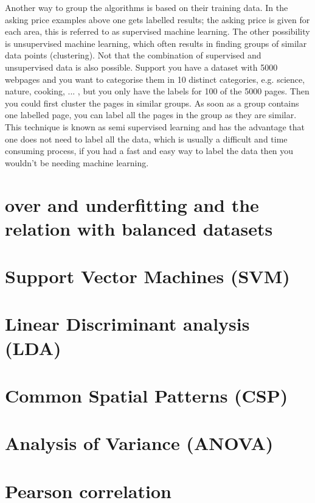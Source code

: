 \npar

Another way to group the algorithms is based on their training data. In the asking price examples above one gets labelled results; the asking price is given for each area, this is referred to as supervised machine learning. The other possibility is unsupervised machine learning, which often results in finding groups of similar data points (clustering). Not that the combination of supervised and unsupervised data is also possible. Support you have a dataset with 5000 webpages and you want to categorise them in 10 distinct categories, e.g. science, nature, cooking, ... , but you only have the labels for 100 of the 5000 pages. Then you could first cluster the pages in similar groups. As soon as a group contains one labelled page, you can label all the pages in the group as they are similar. This technique is known as semi supervised learning and has the advantage that one does  not need to label all the data, which is usually a difficult and time consuming process, if you had a fast and easy way to label the data then you wouldn't be needing machine learning.

\section{over and underfitting and the relation with balanced datasets}


\section{Support Vector Machines (SVM)}

\section{Linear Discriminant analysis (LDA)}

\section{Common Spatial Patterns (CSP)}

\section{Analysis of Variance (ANOVA)}

\section{Pearson correlation}
